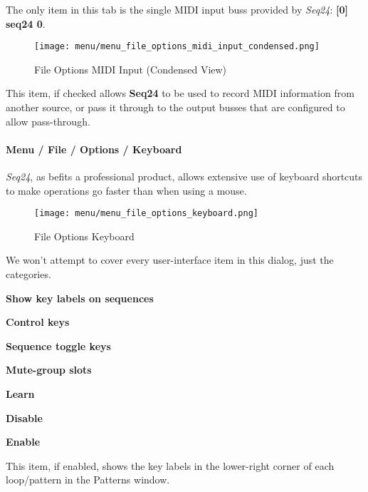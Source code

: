    The only item in this tab is the single MIDI input buss provided
   by \textsl{Seq24}:  \textbf{[0] seq24 0}.

\begin{figure}[H]
   \centering 
   \texttt{[image: menu/menu\_file\_options\_midi\_input\_condensed.png]}
   \caption{File Options MIDI Input (Condensed View)}
   \label{fig:seq24_menu_file_options_midi_input}
\end{figure}

   This item, if checked allows \textbf{Seq24} to be used to record MIDI
   information from another source, or pass it through to the output busses
   that are configured to allow pass-through.

\paragraph{Menu / File / Options / Keyboard }
\label{paragraph:seq24_menu_file_options_keyboard}

   \textsl{Seq24}, as befits a professional product, allows extensive use of
   keyboard shortcuts to make operations go faster than when using a mouse.

\begin{figure}[H]
   \centering 
   \texttt{[image: menu/menu\_file\_options\_keyboard.png]}
   \caption{File Options Keyboard}
   \label{fig:seq24_menu_file_options_keyboard}
\end{figure}

   We won't attempt to cover every user-interface item in this dialog, just
   the categories.

   \begin{enumber}
      \item \textbf{Show key labels on sequences}
      \item \textbf{Control keys}
      \item \textbf{Sequence toggle keys}
      \item \textbf{Mute-group slots}
      \item \textbf{Learn}
      \item \textbf{Disable}
      \item \textbf{Enable}
   \end{enumber}

   \setcounter{ItemCounter}{0}      %

   This item, if enabled, shows the key labels in the lower-right corner of
   each loop/pattern in the Patterns window.

